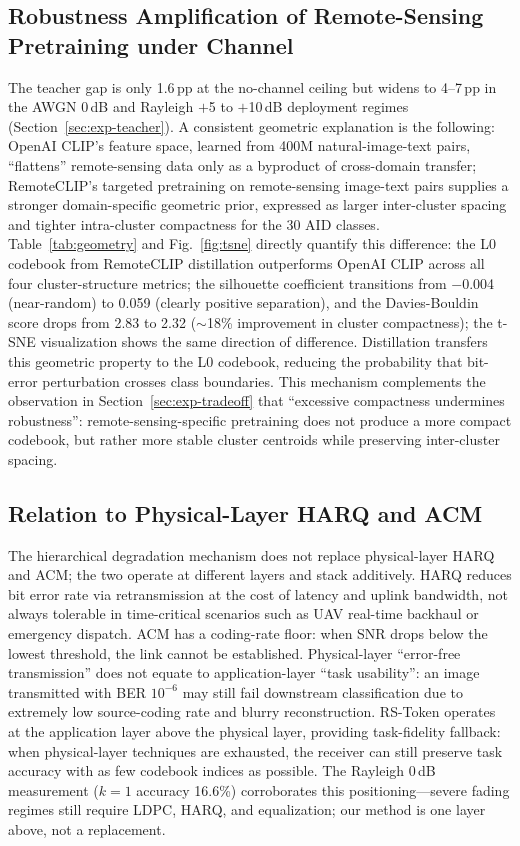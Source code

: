 \documentclass[lettersize,journal]{IEEEtran}
\begin{document}
\subsection{Robustness Amplification of Remote-Sensing Pretraining under Channel}
The teacher gap is only 1.6\,pp at the no-channel ceiling but widens to 4--7\,pp in the AWGN 0\,dB and Rayleigh $+$5 to $+$10\,dB deployment regimes (Section~\ref{sec:exp-teacher}). A consistent geometric explanation is the following: OpenAI CLIP's feature space, learned from 400M natural-image-text pairs, ``flattens'' remote-sensing data only as a byproduct of cross-domain transfer; RemoteCLIP's targeted pretraining on remote-sensing image-text pairs supplies a stronger domain-specific geometric prior, expressed as larger inter-cluster spacing and tighter intra-cluster compactness for the 30 AID classes. Table~\ref{tab:geometry} and Fig.~\ref{fig:tsne} directly quantify this difference: the L0 codebook from RemoteCLIP distillation outperforms OpenAI CLIP across all four cluster-structure metrics; the silhouette coefficient transitions from $-$0.004 (near-random) to 0.059 (clearly positive separation), and the Davies-Bouldin score drops from 2.83 to 2.32 ($\sim$18\% improvement in cluster compactness); the t-SNE visualization shows the same direction of difference. Distillation transfers this geometric property to the L0 codebook, reducing the probability that bit-error perturbation crosses class boundaries. This mechanism complements the observation in Section~\ref{sec:exp-tradeoff} that ``excessive compactness undermines robustness'': remote-sensing-specific pretraining does not produce a more compact codebook, but rather more stable cluster centroids while preserving inter-cluster spacing.

\subsection{Relation to Physical-Layer HARQ and ACM}
\label{sec:disc-harq}

The hierarchical degradation mechanism does not replace physical-layer HARQ and ACM; the two operate at different layers and stack additively. HARQ reduces bit error rate via retransmission at the cost of latency and uplink bandwidth, not always tolerable in time-critical scenarios such as UAV real-time backhaul or emergency dispatch. ACM has a coding-rate floor: when SNR drops below the lowest threshold, the link cannot be established. Physical-layer ``error-free transmission'' does not equate to application-layer ``task usability'': an image transmitted with BER $10^{-6}$ may still fail downstream classification due to extremely low source-coding rate and blurry reconstruction. RS-Token operates at the application layer above the physical layer, providing task-fidelity fallback: when physical-layer techniques are exhausted, the receiver can still preserve task accuracy with as few codebook indices as possible. The Rayleigh 0\,dB measurement ($k=1$ accuracy 16.6\%) corroborates this positioning---severe fading regimes still require LDPC, HARQ, and equalization; our method is one layer above, not a replacement.
\end{document}
